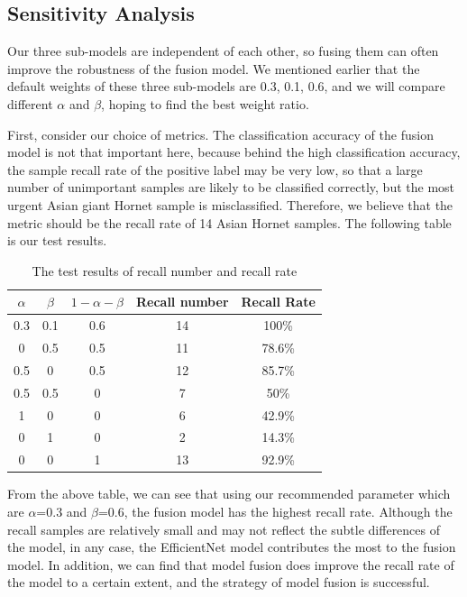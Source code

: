 \documentclass{mcmthesis}
\numberwithin{figure}{section}
\numberwithin{table}{section}
\begin{document}
\subsection{Sensitivity Analysis}
Our three sub-models are independent of each other, so fusing them can often improve the robustness of the fusion model. We mentioned earlier that the default weights of these three sub-models are 0.3, 0.1, 0.6, and we will compare different $\alpha$ and $\beta$, hoping to find the best weight ratio.

First, consider our choice of metrics. The classification accuracy of the fusion model is not that important here, because behind the high classification accuracy, the sample recall rate of the positive label may be very low, so that a large number of unimportant samples are likely to be classified correctly, but the most urgent Asian giant Hornet sample is misclassified. Therefore, we believe that the metric should be the recall rate of 14 Asian Hornet samples. The following table is our test results.

\begin{table}[]
  \centering
  \begin{tabular}{ccccc}
  \hline
  $ \alpha $ & $\beta $ & $1-\alpha-\beta$ & Recall number & Recall Rate \\ \hline
  0.3        & 0.1      & 0.6              & 14            & 100\%       \\
  0          & 0.5      & 0.5              & 11            & 78.6\%      \\
  0.5        & 0        & 0.5              & 12            & 85.7\%      \\
  0.5        & 0.5      & 0                & 7             & 50\%        \\
  1          & 0        & 0                & 6             & 42.9\%      \\
  0          & 1        & 0                & 2             & 14.3\%      \\
  0          & 0        & 1                & 13            & 92.9\%      \\ \hline
  \end{tabular}
  \caption{The test results of recall number and recall rate}
  \end{table}
  

From the above table, we can see that using our recommended parameter which are $\alpha$=0.3 and $\beta$=0.6, the fusion model has the highest recall rate. Although the recall samples are relatively small and may not reflect the subtle differences of the model, in any case, the EfficientNet model contributes the most to the fusion model. In addition, we can find that model fusion does improve the recall rate of the model to a certain extent, and the strategy of model fusion is successful.
\end{document}
